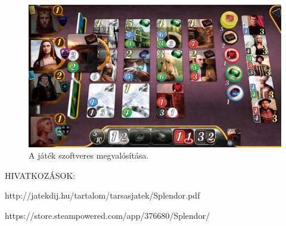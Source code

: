\begin{figure}[h]
\centering
\includegraphics[scale=0.2]{images/digital_edition.jpg}
\caption{A játék szoftveres megvalósítása.}
\label{fig:digital}
\end{figure}


\vspace{3cm}
HIVATKOZÁSOK:\par
http://jatekdij.hu/tartalom/tarsasjatek/Splendor.pdf\par
https://store.steampowered.com/app/376680/Splendor/

